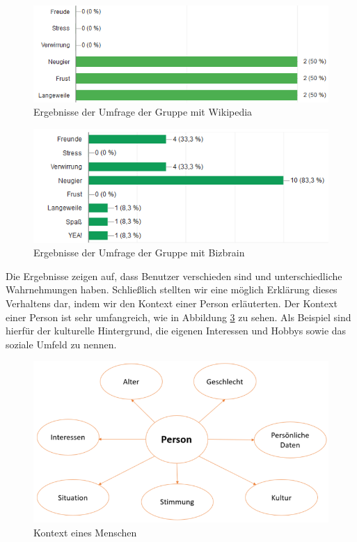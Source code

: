 \begin{figure}[!h]
	\centering
	\includegraphics[width=1\linewidth]{Pictures/wiki_kaffee}
	\caption[Ergebnis der grafischen Website]{Ergebnisse der Umfrage der Gruppe mit Wikipedia}
	\label{fig:ergebnis_1}
\end{figure}

\begin{figure}[!h]
	\centering
	\includegraphics[width=1\linewidth]{Pictures/bizbuzz}
	\caption[Ergebnis von Wikipedia]{Ergebnisse der Umfrage der Gruppe mit Bizbrain}
	\label{fig:ergebnis_2}
\end{figure}

Die Ergebnisse zeigen auf, dass Benutzer verschieden sind und unterschiedliche Wahrnehmungen haben. Schließlich stellten wir eine möglich Erklärung dieses Verhaltens dar, indem wir den Kontext einer Person erläuterten. Der Kontext einer Person ist sehr umfangreich, wie in Abbildung \ref{fig:contextmensch} zu sehen. Als Beispiel sind hierfür der kulturelle Hintergrund, die eigenen Interessen und Hobbys sowie das soziale Umfeld zu nennen.

\begin{figure}[h!]
	\centering
	\includegraphics[width=1\linewidth]{Pictures/Context_Mensch}
	\caption[Kontext eines Menschen]{Kontext eines Menschen}
	\label{fig:contextmensch}
\end{figure}





